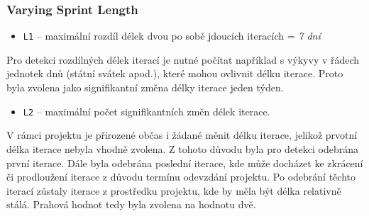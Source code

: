 \documentclass[czech,DP]{thesiskiv}
\begin{document}
\subsubsection{Varying Sprint Length}
\begin{itemize}
    \item \texttt{L1} -- maximální rozdíl délek dvou po sobě jdoucích iteracích = \textit{7 dní}
\end{itemize}
Pro detekci rozdílných délek iterací je nutné počítat například s výkyvy v řádech jednotek dnů (státní svátek apod.), které mohou ovlivnit délku iterace. Proto byla zvolena jako signifikantní změna délky iterace jeden týden.
\begin{itemize}
    \item \texttt{L2} -- maximální počet signifikantních změn délek iterace. 
\end{itemize}
V rámci projektu je přirozené občas i žádané měnit délku iterace, jelikož prvotní délka iterace nebyla vhodně zvolena. Z tohoto důvodu byla pro detekci odebrána první iterace. Dále byla odebrána poslední iterace, kde může docházet ke zkrácení či prodloužení iterace z důvodu termínu odevzdání projektu. Po odebrání těchto iterací zůstaly iterace z prostředku projektu, kde by měla být délka relativně stálá. Prahová hodnot tedy byla zvolena na hodnotu dvě.
\end{document}
